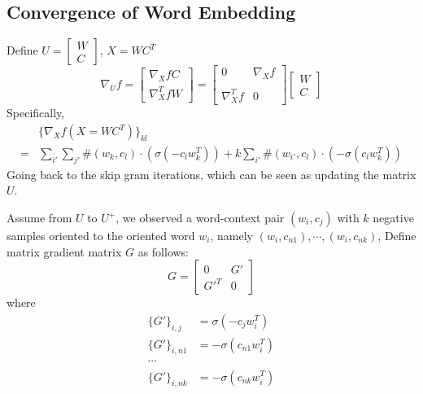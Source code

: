 \documentclass[letterpaper]{article} %
\begin{document}
\subsection{Convergence of Word Embedding}
Define $U=\begin{bmatrix}W\\C\end{bmatrix}$, $X=WC^T$
\begin{equation}
\nabla_U f=\begin{bmatrix}\nabla_X fC\\\nabla^T_X fW\end{bmatrix}=\begin{bmatrix}0&\nabla_X f\\ \\\nabla^T_X f&0\end{bmatrix}\begin{bmatrix}W\\C\end{bmatrix}
\end{equation}
Specifically, 
\begin{equation}
\begin{split}
	&\{\nabla_X f(X=WC^T)\}_{kl}\\
	=&\sum_{i'}\sum_{j'}\#(w_k, c_l)\cdot(\sigma(-c_lw^T_k))+k\sum_{i'}\#(w_{i'}, c_l)\cdot(-\sigma(c_lw^T_k))\label{eq: grad f}
\end{split}
\end{equation}
Going back to the skip gram iterations, which can be seen as updating the matrix $U$.

Assume from $U$ to $U^+$, we observed a word-context pair $(w_i,c_j)$ with $k$ negative samples oriented to the oriented word $w_i$, namely $(w_i,c_{n1}),\cdots,(w_i,c_{nk})$, Define matrix gradient matrix $G$ as follows:
\begin{equation}
G=\begin{bmatrix}0&G'\\G'^T&0\end{bmatrix}
\end{equation}
where
\begin{equation}
\begin{split}
\{G'\}_{i,j}&=\sigma(-c_jw_i^T)\\
\{G'\}_{i,n1}&=-\sigma(c_{n1}w_i^T)\\
\cdots\\
\{G'\}_{i,nk}&=-\sigma(c_{nk}w_i^T)
\end{split}
\end{equation}
\end{document}
